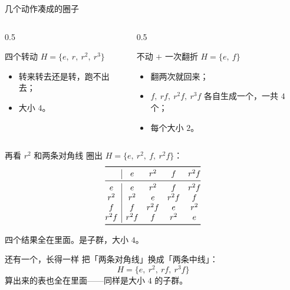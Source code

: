 \documentclass[10pt]{beamer}
\begin{document}
\begin{frame}{几个动作凑成的圈子}
  \begin{columns}[T]
    \begin{column}{0.5\textwidth}
      \begin{block}{四个转动}
        \(H=\{e,\ r,\ r^2,\ r^3\}\)
        \begin{itemize}
          \item 转来转去还是转，跑不出去；
          \item 大小 \(4\)。
        \end{itemize}
      \end{block}
    \end{column}
    \begin{column}{0.5\textwidth}
      \begin{block}{不动 \(+\) 一次翻折}
        \(H=\{e,\ f\}\)
        \begin{itemize}
          \item 翻两次就回来；
          \item \(f,\ rf,\ r^2f,\ r^3f\) 各自生成一个，一共 \(4\) 个；
          \item 每个大小 \(2\)。
        \end{itemize}
      \end{block}
    \end{column}
  \end{columns}
\end{frame}

\begin{frame}{再看 \(r^2\) 和两条对角线}
  圈出 \(H=\{e,\ r^2,\ f,\ r^2f\}\)：
  \pause
  \[
  \begin{array}{@{}c|cccc@{}}
    \toprule
    & e & r^2 & f & r^2f \\
    \midrule
    e & e & r^2 & f & r^2f \\
    r^2 & r^2 & e & r^2f & f \\
    f & f & r^2f & e & r^2 \\
    r^2f & r^2f & f & r^2 & e \\
    \bottomrule
  \end{array}
  \]
  \pause
  \begin{center}
    四个结果全在里面。\quad 是子群，大小 \(4\)。
  \end{center}
\end{frame}

\begin{frame}{还有一个，长得一样}
  把「两条对角线」换成「两条中线」：
  \[
    H=\{e,\ r^2,\ rf,\ r^3f\}
  \]
  \pause
  算出来的表也全在里面——同样是大小 \(4\) 的子群。
\end{frame}
\end{document}

